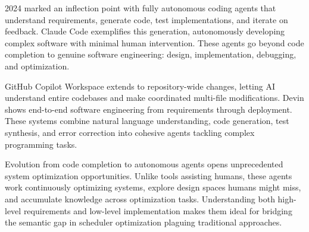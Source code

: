 2024 marked an inflection point with fully autonomous coding agents that understand requirements, generate code, test implementations, and iterate on feedback. Claude Code exemplifies this generation, autonomously developing complex software with minimal human intervention. These agents go beyond code completion to genuine software engineering: design, implementation, debugging, and optimization.

GitHub Copilot Workspace extends to repository-wide changes, letting AI understand entire codebases and make coordinated multi-file modifications. Devin shows end-to-end software engineering from requirements through deployment. These systems combine natural language understanding, code generation, test synthesis, and error correction into cohesive agents tackling complex programming tasks.

Evolution from code completion to autonomous agents opens unprecedented system optimization opportunities. Unlike tools assisting humans, these agents work continuously optimizing systems, explore design spaces humans might miss, and accumulate knowledge across optimization tasks. Understanding both high-level requirements and low-level implementation makes them ideal for bridging the semantic gap in scheduler optimization plaguing traditional approaches.